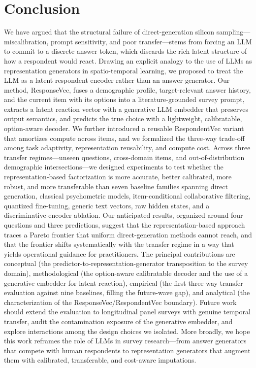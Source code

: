 \section{Conclusion}
\label{sec:conclusion}

We have argued that the structural failure of direct-generation silicon sampling---miscalibration, prompt sensitivity, and poor transfer---stems from forcing an LLM to commit to a discrete answer token, which discards the rich latent structure of how a respondent would react. Drawing an explicit analogy to the use of LLMs as representation generators in spatio-temporal learning, we proposed to treat the LLM as a latent respondent encoder rather than an answer generator. Our method, ResponseVec, fuses a demographic profile, target-relevant answer history, and the current item with its options into a literature-grounded survey prompt, extracts a latent reaction vector with a generative LLM embedder that preserves output semantics, and predicts the true choice with a lightweight, calibratable, option-aware decoder. We further introduced a reusable RespondentVec variant that amortizes compute across items, and we formalized the three-way trade-off among task adaptivity, representation reusability, and compute cost. Across three transfer regimes---unseen questions, cross-domain items, and out-of-distribution demographic intersections---we designed experiments to test whether the representation-based factorization is more accurate, better calibrated, more robust, and more transferable than seven baseline families spanning direct generation, classical psychometric models, item-conditional collaborative filtering, quantized fine-tuning, generic text vectors, raw hidden states, and a discriminative-encoder ablation. Our anticipated results, organized around four questions and three predictions, suggest that the representation-based approach traces a Pareto frontier that uniform direct-generation methods cannot reach, and that the frontier shifts systematically with the transfer regime in a way that yields operational guidance for practitioners. The principal contributions are conceptual (the predictor-to-representation-generator transposition to the survey domain), methodological (the option-aware calibratable decoder and the use of a generative embedder for latent reaction), empirical (the first three-way transfer evaluation against nine baselines, filling the future-wave gap), and analytical (the characterization of the ResponseVec/RespondentVec boundary). Future work should extend the evaluation to longitudinal panel surveys with genuine temporal transfer, audit the contamination exposure of the generative embedder, and explore interactions among the design choices we isolated. More broadly, we hope this work reframes the role of LLMs in survey research---from answer generators that compete with human respondents to representation generators that augment them with calibrated, transferable, and cost-aware imputations.
